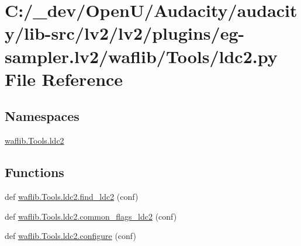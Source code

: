 \hypertarget{lv2_2plugins_2eg-sampler_8lv2_2waflib_2_tools_2ldc2_8py}{}\section{C\+:/\+\_\+dev/\+Open\+U/\+Audacity/audacity/lib-\/src/lv2/lv2/plugins/eg-\/sampler.lv2/waflib/\+Tools/ldc2.py File Reference}
\label{lv2_2plugins_2eg-sampler_8lv2_2waflib_2_tools_2ldc2_8py}
\subsection*{Namespaces}
\begin{DoxyCompactItemize}
\item 
 \hyperlink{namespacewaflib_1_1_tools_1_1ldc2}{waflib.\+Tools.\+ldc2}
\end{DoxyCompactItemize}
\subsection*{Functions}
\begin{DoxyCompactItemize}
\item 
def \hyperlink{namespacewaflib_1_1_tools_1_1ldc2_a73aa41d45a6712decaf40b6bc5d35ee5}{waflib.\+Tools.\+ldc2.\+find\+\_\+ldc2} (conf)
\item 
def \hyperlink{namespacewaflib_1_1_tools_1_1ldc2_a183e4e7be481c7c81988655ddc0346d6}{waflib.\+Tools.\+ldc2.\+common\+\_\+flags\+\_\+ldc2} (conf)
\item 
def \hyperlink{namespacewaflib_1_1_tools_1_1ldc2_a930f6047abb96feb45e7391418e486ec}{waflib.\+Tools.\+ldc2.\+configure} (conf)
\end{DoxyCompactItemize}
